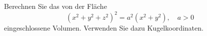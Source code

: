 \begin{atiTask}[
  title = Volumenberechnung I,
]
 Berechnen Sie das von der Fläche
 \begin{equation*}
(x^2+y^2+z^2)^2=a^2(x^2+y^2), \quad a>0
 \end{equation*}
eingeschlossene Volumen. Verwenden Sie dazu Kugelkoordinaten.

\end{atiTask}
\begin{atiSolution}

\end{atiSolution}
